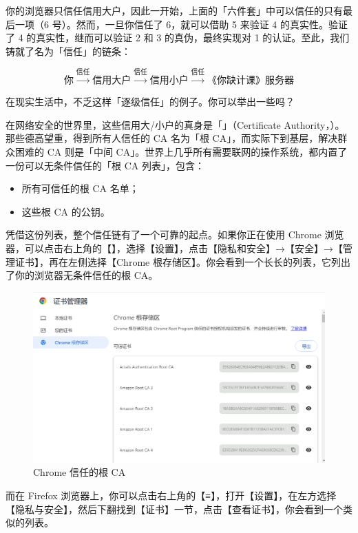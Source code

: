 你的浏览器只信任信用大户，因此一开始，上面的「六件套」中可以信任的只有最后一项（6 号）。然而，一旦你信任了 6，就可以借助 5 来验证 4 的真实性。验证了 4 的真实性，继而可以验证 2 和 3 的真伪，最终实现对 1 的认证。至此，我们铸就了名为「信任」的链条：

\[ \text{你}\xrightarrow{\text{信任}}\text{信用大户}\xrightarrow{\text{信任}}\text{信用小户}\xrightarrow{\text{信任}}\text{《你缺计课》服务器} \]

\begin{note}
  在现实生活中，不乏这样「逐级信任」的例子。你可以举出一些吗？
\end{note}

在网络安全的世界里，这些信用大/小户的真身是「」（Certificate Authority，）。那些德高望重，得到所有人信任的 CA 名为「根 CA」，而实际下到基层，解决群众困难的 CA 则是「中间 CA」。世界上几乎所有需要联网的操作系统，都内置了一份可以无条件信任的「根 CA 列表」，包含：

\begin{itemize}
  \item 所有可信任的根 CA 名单；
  \item 这些根 CA 的公钥。
\end{itemize}

凭借这份列表，整个信任链有了一个可靠的起点。如果你正在使用 Chrome 浏览器，可以点击右上角的【】，选择【设置】，点击【隐私和安全】→【安全】→【管理证书】，再在左侧选择【Chrome 根存储区】。你会看到一个长长的列表，它列出了你的浏览器无条件信任的根 CA。

\begin{figure}[htb!]
  \centering
  \includegraphics[width=.65\textwidth]{assets/surpass/Chrome_Root_CAs.png}
  \caption{Chrome 信任的根 CA}
  \label{fig:Chrome_Root_CAs}
\end{figure}

而在 Firefox 浏览器上，你可以点击右上角的【≡】，打开【设置】，在左方选择【隐私与安全】，然后下翻找到【证书】一节，点击【查看证书】，你会看到一个类似的列表。

